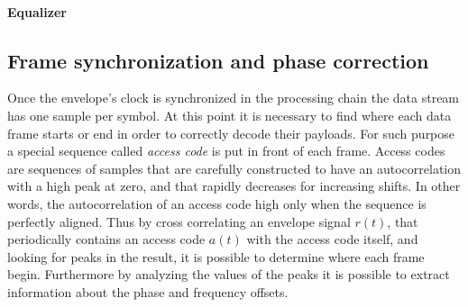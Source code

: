 \paragraph{Equalizer}


\subsection{Frame synchronization and phase correction} \label{sec:phasecorr}

Once the envelope's clock is synchronized in the processing chain the data stream has one sample per symbol. At this point it is necessary to find where each data frame starts or end in order to correctly decode their payloads. For such purpose a special sequence called \emph{access code} is put in front of each frame. Access codes are sequences of samples that are carefully constructed to have an autocorrelation with a high peak at zero, and that rapidly decreases for increasing shifts. In other words, the autocorrelation of an access code high only when the sequence is perfectly aligned. Thus by cross correlating an envelope signal \(r(t)\), that periodically contains an access code \(a(t)\) with the access code itself, and looking for peaks in the result, it is possible to determine where each frame begin. Furthermore by analyzing the values of the peaks it is possible to extract information about the phase and frequency offsets.

